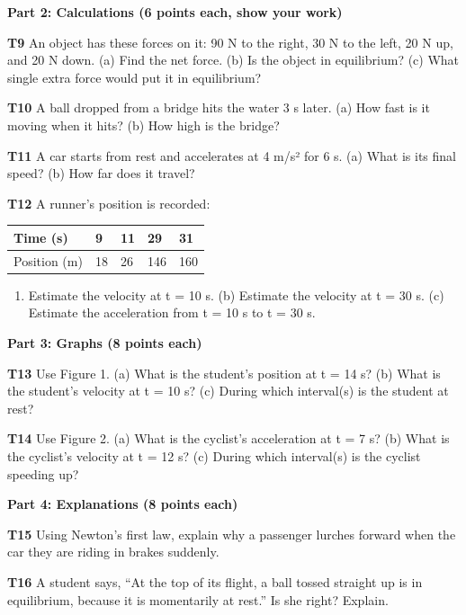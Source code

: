 \documentclass[
]{article}
\newcounter{none} %
\providecommand{\tightlist}{%
  \setlength{\itemsep}{0pt}\setlength{\parskip}{0pt}}
\begin{document}
\textbf{Part 2: Calculations (6 points each, show your work)}

\textbf{T9} An object has these forces on it: 90 N to the right, 30 N to
the left, 20 N up, and 20 N down. (a) Find the net force. (b) Is the
object in equilibrium? (c) What single extra force would put it in
equilibrium?

\textbf{T10} A ball dropped from a bridge hits the water 3 s later. (a)
How fast is it moving when it hits? (b) How high is the bridge?

\textbf{T11} A car starts from rest and accelerates at 4 m/s² for 6 s.
(a) What is its final speed? (b) How far does it travel?

\textbf{T12} A runner's position is recorded:

{\def\LTcaptype{none} %
\begin{longtable}[]{@{}lllll@{}}
\toprule\noalign{}
Time (s) & 9 & 11 & 29 & 31 \\
\midrule\noalign{}
\endhead
\bottomrule\noalign{}
\endlastfoot
Position (m) & 18 & 26 & 146 & 160 \\
\end{longtable}
}

\begin{enumerate}
\def\labelenumi{(\alph{enumi})}
\tightlist
\item
  Estimate the velocity at t = 10 s. (b) Estimate the velocity at t = 30
  s. (c) Estimate the acceleration from t = 10 s to t = 30 s.
\end{enumerate}

\textbf{Part 3: Graphs (8 points each)}

\textbf{T13} Use Figure 1. (a) What is the student's position at t = 14
s? (b) What is the student's velocity at t = 10 s? (c) During which
interval(s) is the student at rest?

\textbf{T14} Use Figure 2. (a) What is the cyclist's acceleration at t =
7 s? (b) What is the cyclist's velocity at t = 12 s? (c) During which
interval(s) is the cyclist speeding up?

\textbf{Part 4: Explanations (8 points each)}

\textbf{T15} Using Newton's first law, explain why a passenger lurches
forward when the car they are riding in brakes suddenly.

\textbf{T16} A student says, ``At the top of its flight, a ball tossed
straight up is in equilibrium, because it is momentarily at rest.'' Is
she right? Explain.
\end{document}
